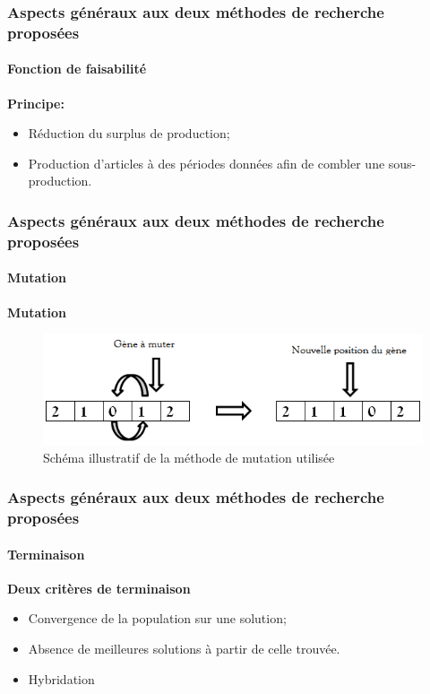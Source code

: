 \documentclass[11pt]{beamer}
\begin{document}
 \begin{frame}
 \frametitle{Aspects généraux aux deux méthodes de recherche proposées}
 \framesubtitle{Fonction de faisabilité}
	
	\textbf{Principe:}
	\vspace*{.5cm}
    \begin{itemize}
    	\item Réduction du surplus de production;
    	\vspace*{.5cm}
    	\item<2-> Production d'articles à des périodes données afin de combler une sous-production.
    \end{itemize}
	
 \end{frame} 
 
 \begin{frame}
 \frametitle{Aspects généraux aux deux méthodes de recherche proposées}
 \framesubtitle{Mutation}
	
	\textbf{Mutation}
	\begin{figure}[!h]
		\begin{center}
			\includegraphics[scale=.5
			]{img/mutation_fig.png}
			\caption{Schéma illustratif de la méthode de mutation utilisée}
		\end{center}
 \end{figure}
	
 \end{frame}
 
 \begin{frame}
 \frametitle{Aspects généraux aux deux méthodes de recherche proposées}
 \framesubtitle{Terminaison}
	
	\textbf{Deux critères de terminaison}
	\vspace*{.5cm}
	\begin{itemize}
		\item Convergence de la population sur une solution;
		\vspace*{.5cm}
		\item<2-> Absence de meilleures solutions à partir de celle trouvée.
		\vspace*{.5cm}
		\item<3-> Hybridation
	\end{itemize}
	
 \end{frame}
 
\end{document}
